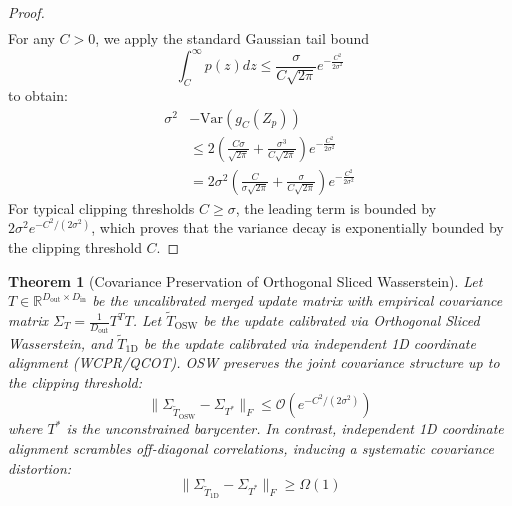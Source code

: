 \documentclass{article}
\theoremstyle{plain}
\newtheorem{theorem}{Theorem}[section]
\theoremstyle{definition}
\theoremstyle{remark}
\begin{document}
\begin{proof}
\begin{align}
\end{align}
For any $C > 0$, we apply the standard Gaussian tail bound
\begin{equation}
\int_C^\infty p(z) dz \le \frac{\sigma}{C \sqrt{2\pi}} e^{-\frac{C^2}{2\sigma^2}}
\end{equation}
to obtain:
\begin{align}
\sigma^2 &- \text{Var}(g_C(Z_p)) \nonumber \\
&\le 2 \left( \frac{C \sigma}{\sqrt{2\pi}} + \frac{\sigma^3}{C\sqrt{2\pi}} \right) e^{-\frac{C^2}{2\sigma^2}} \nonumber \\
&= 2 \sigma^2 \left( \frac{C}{\sigma\sqrt{2\pi}} + \frac{\sigma}{C\sqrt{2\pi}} \right) e^{-\frac{C^2}{2\sigma^2}}
\end{align}
For typical clipping thresholds $C \ge \sigma$, the leading term is bounded by $2\sigma^2 e^{-C^2 / (2\sigma^2)}$, which proves that the variance decay is exponentially bounded by the clipping threshold $C$.
\end{proof}

\begin{theorem}[Covariance Preservation of Orthogonal Sliced Wasserstein]
\label{thm:covariance}
Let $T \in \mathbb{R}^{D_{\text{out}} \times D_{\text{in}}}$ be the uncalibrated merged update matrix with empirical covariance matrix $\Sigma_T = \frac{1}{D_{\text{out}}} T^T T$. Let $\tilde{T}_{\text{OSW}}$ be the update calibrated via Orthogonal Sliced Wasserstein, and $\tilde{T}_{\text{1D}}$ be the update calibrated via independent 1D coordinate alignment (WCPR/QCOT). OSW preserves the joint covariance structure up to the clipping threshold:
\begin{equation}
\|\Sigma_{\tilde{T}_{\text{OSW}}} - \Sigma_{T^*}\|_F \le \mathcal{O}\left( e^{-C^2 / (2\sigma^2)} \right)
\end{equation}
where $T^*$ is the unconstrained barycenter. In contrast, independent 1D coordinate alignment scrambles off-diagonal correlations, inducing a systematic covariance distortion:
\begin{equation}
\|\Sigma_{\tilde{T}_{\text{1D}}} - \Sigma_{T^*}\|_F \ge \Omega(1)
\end{equation}
\end{theorem}
\end{document}
